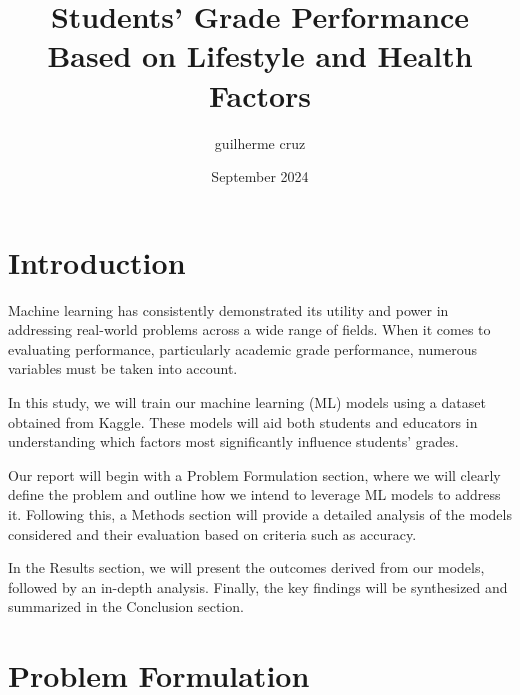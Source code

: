 \documentclass{article}
\title{Students' Grade Performance Based on Lifestyle and Health Factors}
\author{guilherme cruz}
\date{September 2024}
\begin{document}
\maketitle

\section{Introduction}
Machine learning has consistently demonstrated its utility and power in addressing real-world problems across a wide range of fields. When it comes to evaluating performance, particularly academic grade performance, numerous variables must be taken into account.

In this study, we will train our machine learning (ML) models using a dataset obtained from Kaggle. These models will aid both students and educators in understanding which factors most significantly influence students' grades.

Our report will begin with a Problem Formulation section, where we will clearly define the problem and outline how we intend to leverage ML models to address it. Following this, a Methods section will provide a detailed analysis of the models considered and their evaluation based on criteria such as accuracy.

In the Results section, we will present the outcomes derived from our models, followed by an in-depth analysis. Finally, the key findings will be synthesized and summarized in the Conclusion section.

\section{Problem Formulation}
\end{document}
